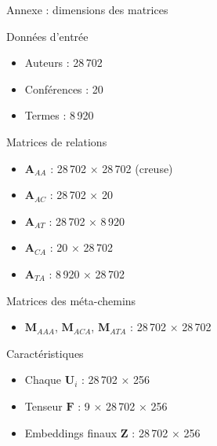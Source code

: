 \documentclass[9pt,aspectratio=169,professionalfonts]{beamer}
\begin{document}
\appendix

\begin{frame}{Annexe : dimensions des matrices}
\begin{block}{Données d'entrée}
\begin{itemize}
    \item Auteurs : 28\,702
    \item Conférences : 20
    \item Termes : 8\,920
\end{itemize}
\end{block}

\begin{block}{Matrices de relations}
\begin{itemize}
    \item $\mathbf A_{AA}$ : 28\,702 × 28\,702 (creuse)
    \item $\mathbf A_{AC}$ : 28\,702 × 20
    \item $\mathbf A_{AT}$ : 28\,702 × 8\,920
    \item $\mathbf A_{CA}$ : 20 × 28\,702
    \item $\mathbf A_{TA}$ : 8\,920 × 28\,702
\end{itemize}
\end{block}

\begin{block}{Matrices des méta-chemins}
\begin{itemize}
    \item $\mathbf M_{AAA}$, $\mathbf M_{ACA}$, $\mathbf M_{ATA}$ : 28\,702 × 28\,702
\end{itemize}
\end{block}

\begin{block}{Caractéristiques}
\begin{itemize}
    \item Chaque $\mathbf U_i$ : 28\,702 × 256
    \item Tenseur $\mathbf F$ : 9 × 28\,702 × 256
    \item Embeddings finaux $\mathbf Z$ : 28\,702 × 256
\end{itemize}
\end{block}
\end{frame}
\end{document}
